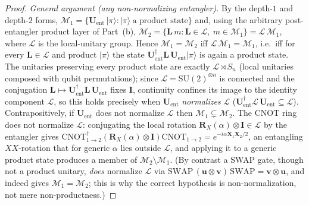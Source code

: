 \documentclass[11pt]{article}
\newcommand{\SU}{\mathrm{SU}}
\newcommand{\CNOT}{\mathrm{CNOT}}
\newcommand{\cM}{\mathcal{M}}
\theoremstyle{plain}
\theoremstyle{plain}
\begin{document}
\begin{proof}
\emph{General argument (any non-normalizing entangler).}
By the depth-$1$ and depth-$2$ forms,
$\cM_1=\{\mathbf{U}_{\mathrm{ent}}\,|\pi\rangle:|\pi\rangle\ \text{a product state}\}$
and, using the arbitrary post-entangler product layer of Part~(b),
$\cM_2=\{\mathbf{L}\,m:\mathbf{L}\in\mathcal{L},\ m\in\cM_1\}=\mathcal{L}\,\cM_1$,
where $\mathcal{L}$ is the local-unitary group.  Hence $\cM_1=\cM_2$ iff
$\mathcal{L}\,\cM_1=\cM_1$, i.e.\ iff for every $\mathbf{L}\in\mathcal{L}$ and
product $|\pi\rangle$ the state
$\mathbf{U}_{\mathrm{ent}}^{\dagger}\mathbf{L}\,\mathbf{U}_{\mathrm{ent}}|\pi\rangle$ is again a
product state.  The unitaries preserving every product state are exactly
$\mathcal{L}\rtimes S_n$ (local unitaries composed with qubit permutations);
since $\mathcal{L}=\SU(2)^{\otimes n}$ is connected and the conjugation
$\mathbf{L}\mapsto\mathbf{U}_{\mathrm{ent}}^{\dagger}\mathbf{L}\,\mathbf{U}_{\mathrm{ent}}$ fixes
$\mathbf{I}$, continuity confines its image to the identity component
$\mathcal{L}$, so this holds precisely when $\mathbf{U}_{\mathrm{ent}}$
\emph{normalizes} $\mathcal{L}$
($\mathbf{U}_{\mathrm{ent}}^{\dagger}\mathcal{L}\,\mathbf{U}_{\mathrm{ent}}\subseteq\mathcal{L}$).
Contrapositively, if $\mathbf{U}_{\mathrm{ent}}$ does not normalize $\mathcal{L}$
then $\cM_1\subsetneq\cM_2$.  The CNOT ring does not normalize
$\mathcal{L}$: conjugating the local rotation
$\mathbf{R}_X(\alpha)\otimes\mathbf{I}\in\mathcal{L}$ by the entangler gives
$\CNOT_{1\to2}^{\dagger}(\mathbf{R}_X(\alpha)\otimes\mathbf{I})\CNOT_{1\to2}
=e^{-i\alpha\mathbf{X}_1\mathbf{X}_2/2}$, an entangling $XX$-rotation that for
generic $\alpha$ lies outside $\mathcal{L}$, and applying it to a generic
product state produces a member of $\cM_2\setminus\cM_1$.  (By contrast a SWAP
gate, though not a product unitary, \emph{does} normalize $\mathcal{L}$
via $\mathrm{SWAP}\,(\mathbf{u}\otimes\mathbf{v})\,\mathrm{SWAP}=\mathbf{v}\otimes\mathbf{u}$, and
indeed gives $\cM_1=\cM_2$; this is why the correct hypothesis is
non-normalization, not mere non-productness.)
\end{proof}
\end{document}
